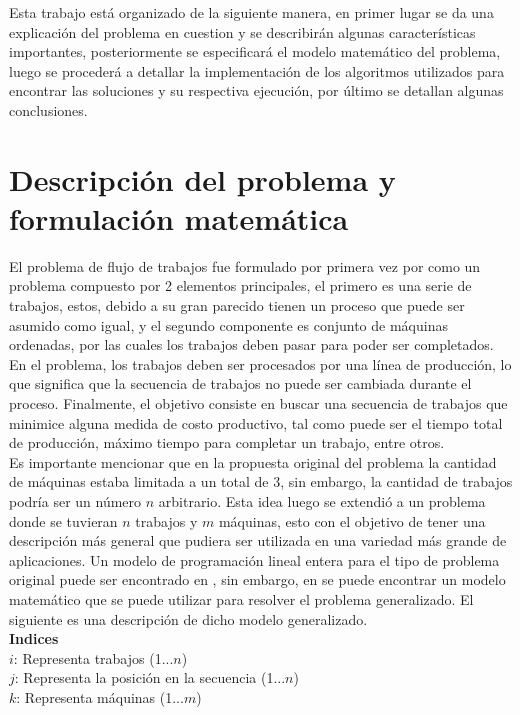 \documentclass[10pt, twoside]{article}
\begin{document}
Esta trabajo está organizado de la siguiente manera, en primer lugar
se da una explicación del problema en cuestion y se describirán algunas
características importantes, posteriormente se especificará el modelo
matemático del problema, luego se procederá a detallar la implementación de los
algoritmos utilizados para encontrar las soluciones y su respectiva ejecución,
por último se detallan algunas conclusiones.\\

\section{Descripción del problema y formulación matemática}\label{sec_mathmod}

El problema de flujo de trabajos fue formulado por primera vez por \cite{original}
como un problema compuesto por 2 elementos principales, el primero es una serie
de trabajos, estos, debido a su gran parecido tienen un proceso que puede ser
asumido como igual, y el segundo componente es conjunto de máquinas ordenadas,
por las cuales los trabajos deben pasar para poder ser completados. En el problema,
los trabajos deben ser procesados por una línea de producción, lo que significa
que la secuencia de trabajos no puede ser cambiada durante el proceso.
Finalmente, el objetivo consiste en buscar una secuencia de trabajos que
minimice alguna medida de costo productivo, tal como puede ser el tiempo total
de producción, máximo tiempo para completar un trabajo, entre otros.
\\

Es importante mencionar que en la propuesta original del problema la cantidad
de máquinas estaba limitada a un total de 3, sin embargo, la cantidad de trabajos
podría ser un número $n$ arbitrario. Esta idea luego se extendió a un problema
donde se tuvieran $n$ trabajos y $m$ máquinas, esto con el objetivo de tener una
descripción más general que pudiera ser utilizada en una variedad
más grande de aplicaciones. Un modelo de programación lineal entera para el tipo
de problema original puede ser encontrado en \cite{old_model}, sin embargo, en
\cite{model} se puede encontrar un modelo matemático que se puede utilizar para
resolver el problema generalizado. El siguiente es una descripción de dicho
modelo generalizado.\\

\noindent
\textbf{Indices}\\
$i$: Representa trabajos (1...$n$)\\
$j$: Representa la posición en la secuencia (1...$n$)\\
$k$: Representa máquinas (1...$m$)\\
\end{document}
